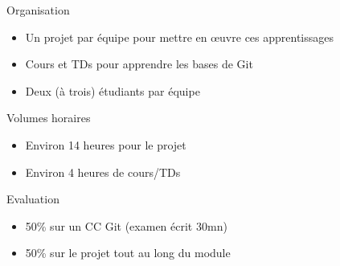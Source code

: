 \documentclass[a4paper,11pt]{beamer}
\begin{document}
\begin{frame}
	\begin{block}{Organisation}
		\begin{itemize}
			\item Un projet par équipe pour mettre en œuvre ces apprentissages
			\item Cours et TDs pour apprendre les bases de Git			
			\item Deux (à trois) étudiants par équipe
		\end{itemize}
	\end{block}

	\begin{block}{Volumes horaires}
		\begin{itemize}
			\item Environ 14 heures pour le projet
			\item Environ 4 heures de cours/TDs
		\end{itemize}
	\end{block}
	\begin{alertblock}{Evaluation}
		\begin{itemize}
			\item 50\% sur un CC Git (examen écrit 30mn)
			\item 50\% sur le projet tout au long du module
		\end{itemize}
	\end{alertblock}
\end{frame}
\end{document}
